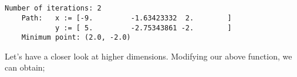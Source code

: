 \documentclass[11pt]{article}
\begin{document}
    \begin{center}
    \end{center}
    { \hspace*{\fill} \\}
    
    \begin{center}
    \end{center}
    { \hspace*{\fill} \\}
    
    \begin{Verbatim}[commandchars=\\\{\}]
Number of iterations: 2
    Path:   x := [-9.         -1.63423332  2.        ]
            y := [ 5.         -2.75343861 -2.        ]
    Minimum point: (2.0, -2.0)
    \end{Verbatim}

    Let's have a closer look at higher dimensions. Modifying our above
function, we can obtain;
\end{document}
